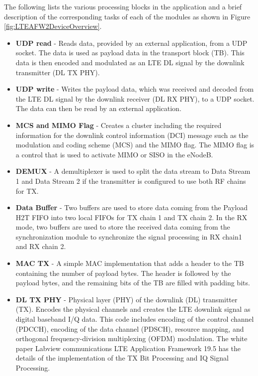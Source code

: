 The following lists the various processing blocks in the application and a brief description of the corresponding tasks of each of the modules as shown in Figure \ref{fig:LTEAFW2DeviceOverview}.

\begin{itemize}
    \item \textbf{UDP read} -
        Reads data, provided by an external application, from a UDP socket. The data is used as payload data in the transport block (TB). This data is then encoded and modulated as an LTE DL signal by the downlink transmitter (DL TX PHY).
    \item \textbf{UDP write} -
        Writes the payload data, which was received and decoded from the LTE DL signal by the downlink receiver (DL RX PHY), to a UDP socket. The data can then be read by an external application.
    \item \textbf{MCS and MIMO Flag} -
        Creates a cluster including the required information for the downlink control information (DCI) message such as the modulation and coding scheme (MCS) and the MIMO flag. The MIMO flag is a control that is used to activate MIMO or SISO in the eNodeB.
    \item \textbf{DEMUX} -
        A demultiplexer is used to split the data stream to Data Stream 1 and Data Stream 2 if the transmitter is configured to use both RF chains for TX. 
    \item \textbf{Data Buffer} -
        Two buffers are used to store data coming from the Payload H2T FIFO into two local FIFOs for TX chain 1 and TX chain 2. In the RX mode, two buffers are used to store the received data coming from the synchronization module to synchronize the signal processing in RX chain1 and RX chain 2.
    \item \textbf{MAC TX} -
        A simple MAC implementation that adds a header to the TB containing the number of payload bytes. The header is followed by the payload bytes, and the remaining bits of the TB are filled with padding bits.
    \item \textbf{DL TX PHY} -
        Physical layer (PHY) of the downlink (DL) transmitter (TX). Encodes the physical channels and creates the LTE downlink signal as digital baseband I/Q data. This code includes encoding of the control channel (PDCCH), encoding of the data channel (PDSCH), resource mapping, and orthogonal frequency-division multiplexing (OFDM) modulation. The white paper Labview communications LTE Application Framework 19.5\cite{LTEAFWManual} has the details of the implementation of the TX Bit Processing and IQ Signal Processing.

\end{itemize}

